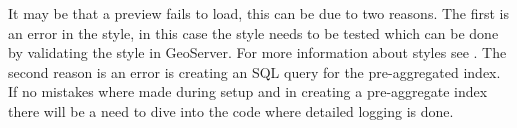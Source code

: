It may be that a preview fails to load, this can be due to two reasons. The first is an error in the style, in this case the style needs to be tested which can be done by validating the style in GeoServer. For more information about styles see . The second reason is an error is creating an SQL query for the pre-aggregated index. If no mistakes where made during setup and in creating a pre-aggregate index there will be a need to dive into the code where detailed logging is done.

